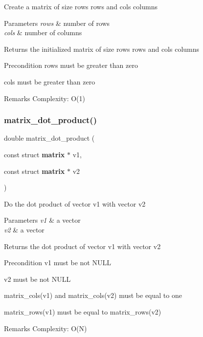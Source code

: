 Create a matrix of size {\ttfamily rows} rows and {\ttfamily cols} columns


\begin{DoxyParams}{Parameters}
{\em rows} & number of rows \\
\hline
{\em cols} & number of columns\\
\hline
\end{DoxyParams}
\begin{DoxyReturn}{Returns}
the initialized matrix of size {\ttfamily rows} rows and {\ttfamily cols} columns
\end{DoxyReturn}
\begin{DoxyPrecond}{Precondition}
{\ttfamily rows} must be greater than zero 

{\ttfamily cols} must be greater than zero
\end{DoxyPrecond}
\begin{DoxyRemark}{Remarks}
Complexity\+: O(1) 
\end{DoxyRemark}
\mbox{\label{matrix_8h_a7ba7365201acc5889936e1836d14cc8b}} 
\subsubsection{matrix\+\_\+dot\+\_\+product()}
{\footnotesize\ttfamily double matrix\+\_\+dot\+\_\+product (\begin{DoxyParamCaption}\item[{const struct \textbf{ matrix} $\ast$}]{v1,  }\item[{const struct \textbf{ matrix} $\ast$}]{v2 }\end{DoxyParamCaption})}

Do the dot product of vector {\ttfamily v1} with vector {\ttfamily v2}


\begin{DoxyParams}{Parameters}
{\em v1} & a vector \\
\hline
{\em v2} & a vector \\
\hline
\end{DoxyParams}
\begin{DoxyReturn}{Returns}
the dot product of vector {\ttfamily v1} with vector {\ttfamily v2}
\end{DoxyReturn}
\begin{DoxyPrecond}{Precondition}
{\ttfamily v1} must be not N\+U\+LL 

{\ttfamily v2} must be not N\+U\+LL 

{\ttfamily matrix\+\_\+cols(v1)} and {\ttfamily matrix\+\_\+cols(v2)} must be equal to one 

{\ttfamily matrix\+\_\+rows(v1)} must be equal to {\ttfamily matrix\+\_\+rows(v2)}
\end{DoxyPrecond}
\begin{DoxyRemark}{Remarks}
Complexity\+: O(\+N) 
\end{DoxyRemark}
\mbox{\label{matrix_8h_ac19cd61ef9f183a9b92d6789399f8646}} 

